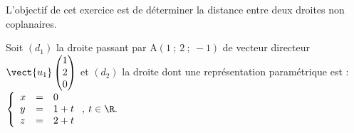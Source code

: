 
\medskip

L'objectif de cet exercice est de déterminer la distance entre deux droites non coplanaires.



Soit $(d_1)$ la droite passant par A$(1~;~2~;~-1)$ de vecteur directeur $\vect{u_1}\begin{pmatrix}1\\2\\0\end{pmatrix}$ et $(d_2)$ la droite dont une représentation paramétrique est : 
$\left\{\begin{array}{l c l}
x&=&0\\y &=& 1 + t\\z &=& 2 + t\\
\end{array}\right.,\: t  \in \R.$

\medskip

